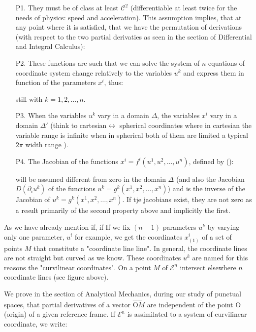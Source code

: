 	\begin{itemize}
		\item[P1.] They must be of class at least $\mathcal{C}^2$ (differentiable at least twice for the needs of physics: speed and acceleration). This assumption implies, that at any point where it is satisfied, that we have the permutation of derivations (with respect to the two partial derivaties as seen in the section of Differential and Integral Calculus):
		

		\item[P2.] These functions are such that we can solve the system of $n$ equations of coordinate system change relatively to the variables $u^k$ and express them in function of the parameters $x^i$, thus:
		
		still with $k=1,2, \ldots,n$.

		\item[P3.] When the variables $u^k$ vary in a domain $\Delta$, the variables $x^i$ vary in a domain $\Delta'$ (think to cartesian$\leftrightarrow$ spherical coordinates where in cartesian the variable range is infinite when in spherical both of them are limited a typical $2\pi$ width range ). 

		\item[P4.] The Jacobian of the functions $x^i=f^i(u^1,u^2,\ldots,u^n)$, defined by ():
		
		will be assumed different from zero in the domain $\Delta$ (and also the Jacobian $D(\partial_i u^k)$ of the functions $u^k=g^k(x^1,x^2,\ldots,x^n)$) and is the inverse of the Jacobian of $u^k=g^k(x^1,x^2,\ldots,x^n)$. If tje jacobians exist, they are not zero as a result primarily of the second property above and implicitly the first.
	\end{itemize}
	As we have already mention if, if If we fix $(n-1)$ parameters $u^k$ by varying only one parameter, $u^i$ for example, we get the coordinates $x_{(1)}^i$ of a set of points $M$ that constitute a "coordinate line line". In general, the coordinate lines are not straight but curved as we know. These coordinates $u^k$ are named for this reasons the "curvilinear coordinates". On a point $M$ of $\mathcal{E}^n$ intersect elsewhere $n$ coordinate lines (see figure above).
	
	We prove in the section of Analytical Mechanics, during our study of punctual spaces, that partial derivatives of a vector $\overrightarrow{\text{O}M}$ are independent of the point O (origin) of a given reference frame. If $\mathcal{E}^n$ is assimilated to a system of curvilinear coordinate, we write:
	
